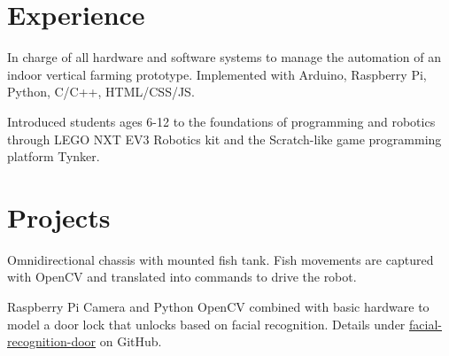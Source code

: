\documentclass[]{deedy-resume-openfont}
\begin{document}
\begin{minipage}[t]{0.66\textwidth} 


\section{Experience}
\vspace{\topsep} %
\begin{tightemize}
\item In charge of all hardware and software systems to manage the
automation of an indoor vertical farming prototype. Implemented
with Arduino, Raspberry Pi, Python, C/C++, HTML/CSS/JS.
\end{tightemize}
\sectionsep

\begin{tightemize}
\item Introduced students ages 6-12 to the foundations of programming
and robotics through LEGO NXT EV3 Robotics kit and the Scratch-like
game programming platform Tynker.
\end{tightemize}
\sectionsep


\section{Projects}
\begin{tightemize}
\item Omnidirectional chassis with mounted fish tank. Fish movements are
captured with OpenCV and translated into commands to drive the robot.
\end{tightemize}
\sectionsep

\begin{tightemize}
\item Raspberry Pi Camera and Python OpenCV combined with basic
hardware to model a door lock that unlocks based on facial
recognition. Details under {\href{https://github.com/zachbellay/facial-recognition-door}{facial-recognition-door}}  on GitHub.
\end{tightemize}
\sectionsep


\end{minipage}
\end{document}
